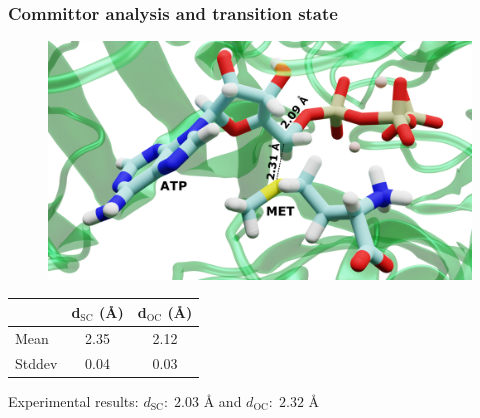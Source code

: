 \documentclass{beamer}
\begin{document}
\begin{frame}
\frametitle{Committor analysis and transition state}
\begin{figure}
\centering
\includegraphics[scale=0.1]{figures/mat2a-trans-labelled.png}
\end{figure}
\begin{center}
\begin{tabular}{l c c}
\hline\hline
 & d$_{\text{SC}}$ ({\AA}) & d$_{\text{OC}}$ ({\AA})\\
\hline
Mean & 2.35 & 2.12 \\
Stddev & 0.04 & 0.03 \\
\hline\hline
\end{tabular}
\end{center}
Experimental results: $d_{\text{SC}}:\;2.03$ {\AA} and $d_{\text{OC}}:\;2.32$ {\AA}
\end{frame}
\end{document}
